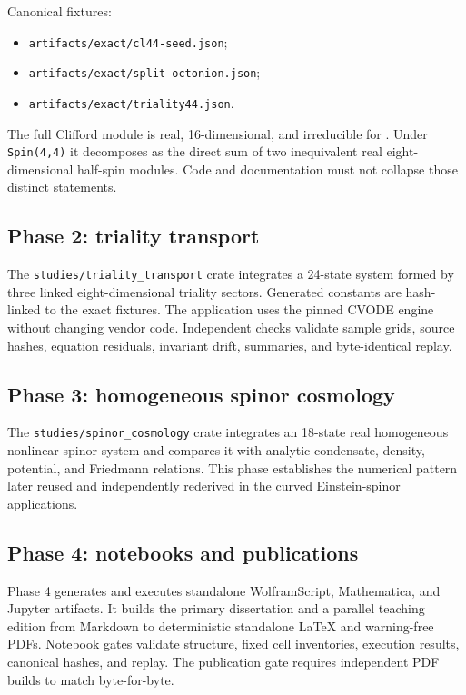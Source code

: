 \documentclass[11pt]{article}
\begin{document}
Canonical fixtures:

\begin{itemize}
\item \texttt{artifact\allowbreak{}s/exact/\allowbreak{}cl44-see\allowbreak{}d.json};
\item \texttt{artifact\allowbreak{}s/exact/\allowbreak{}split-oc\allowbreak{}tonion.j\allowbreak{}son};
\item \texttt{artifact\allowbreak{}s/exact/\allowbreak{}triality\allowbreak{}44.json}.
\end{itemize}

The full Clifford module is real, 16-dimensional, and irreducible for \texttt{}. Under \texttt{Spin(4,4\allowbreak{})} it decomposes as the direct sum of two inequivalent real eight-dimensional half-spin modules. Code and documentation must not collapse those distinct statements.

\subsection{Phase 2: triality transport}

The \texttt{studies/\allowbreak{}triality\allowbreak{}\_transpo\allowbreak{}rt} crate integrates a 24-state system formed by three linked eight-dimensional triality sectors. Generated constants are hash-linked to the exact fixtures. The application uses the pinned CVODE engine without changing vendor code. Independent checks validate sample grids, source hashes, equation residuals, invariant drift, summaries, and byte-identical replay.

\subsection{Phase 3: homogeneous spinor cosmology}

The \texttt{studies/\allowbreak{}spinor\_c\allowbreak{}osmology} crate integrates an 18-state real homogeneous nonlinear-spinor system and compares it with analytic condensate, density, potential, and Friedmann relations. This phase establishes the numerical pattern later reused and independently rederived in the curved Einstein-spinor applications.

\subsection{Phase 4: notebooks and publications}

Phase 4 generates and executes standalone WolframScript, Mathematica, and Jupyter artifacts. It builds the primary dissertation and a parallel teaching edition from Markdown to deterministic standalone LaTeX and warning-free PDFs. Notebook gates validate structure, fixed cell inventories, execution results, canonical hashes, and replay. The publication gate requires independent PDF builds to match byte-for-byte.
\end{document}
